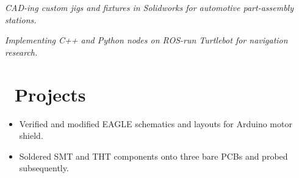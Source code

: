 \documentclass{resume}
\begin{document}
\textit{CAD-ing custom jigs and fixtures in Solidworks for automotive part-assembly stations.}
\begin{comment}
\begin{itemize}
  \item Modeled custom tooling in two assembly stations for a vehicle's seat track mechanism. %
  \item Detailed and ballooned numerous part and assembly drawings.
\end{itemize}
\end{comment}

\textit{Implementing C++ and Python nodes on ROS-run Turtlebot for navigation research.}
\begin{comment}
\begin{itemize}
  \item Wrote C++ and Python nodes to implement navigation stack on Turtlebot. 
  \item Published sensor, odometry and transform messages to mobile base.
  \item Tweaked existing open-source code for advanced algorithms: person-detection, SLAM navigation.
  \item Gained immense troubleshooting experience associated with accommodating open-source software.
\end{itemize}
\end{comment}

\section{\faFlask\ Projects}

\begin{itemize}
  \item Verified and modified EAGLE schematics and layouts for Arduino motor shield. %
  \item Soldered SMT and THT components onto three bare PCBs and probed subsequently.
\end{itemize}
\end{document}
